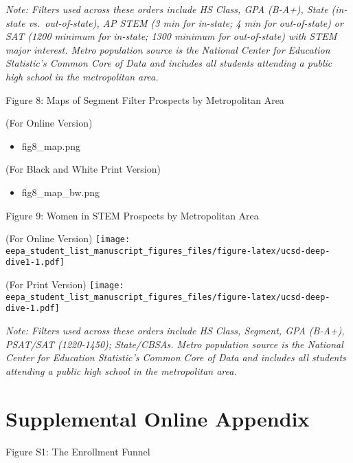 \documentclass[
  12pt,
]{article}
\providecommand{\tightlist}{%
  \setlength{\itemsep}{0pt}\setlength{\parskip}{0pt}}
\begin{document}
\emph{Note: Filters used across these orders include HS Class, GPA (B-A+), State (in-state vs.~out-of-state), AP STEM (3 min for in-state; 4 min for out-of-state) or SAT (1200 minimum for in-state; 1300 minimum for out-of-state) with STEM major interest. Metro population source is the National Center for Education Statistic's Common Core of Data and includes all students attending a public high school in the metropolitan area. }

\pagebreak

Figure 8: Maps of Segment Filter Prospects by Metropolitan Area

(For Online Version)

\begin{itemize}
\tightlist
\item
  fig8\_map.png
\end{itemize}

(For Black and White Print Version)

\begin{itemize}
\tightlist
\item
  fig8\_map\_bw.png
\end{itemize}

\pagebreak

Figure 9: Women in STEM Prospects by Metropolitan Area \newline

(For Online Version) \newline
\texttt{[image: eepa\_student\_list\_manuscript\_figures\_files/figure-latex/ucsd-deep-dive1-1.pdf]}

\pagebreak

(For Print Version) \newline
\texttt{[image: eepa\_student\_list\_manuscript\_figures\_files/figure-latex/ucsd-deep-dive-1.pdf]}

\emph{Note: Filters used across these orders include HS Class, Segment, GPA (B-A+), PSAT/SAT (1220-1450); State/CBSAs. Metro population source is the National Center for Education Statistic's Common Core of Data and includes all students attending a public high school in the metropolitan area. }

\newpage

\hypertarget{supplemental-online-appendix}{%
\section{Supplemental Online Appendix}\label{supplemental-online-appendix}}

Figure S1: The Enrollment Funnel
\end{document}
